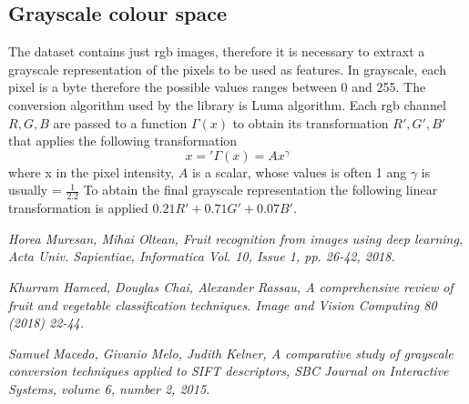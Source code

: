 \documentclass{article}
\begin{document}
\subsection{Grayscale colour space}
The dataset contains just rgb images, therefore it is necessary to extraxt a grayscale representation of the pixels to be used as features.
In grayscale, each pixel is a byte therefore the possible values ranges between 0 and 255. The conversion algorithm used by the library is Luma algorithm. Each rgb channel $R, G, B$ are passed to a function $\Gamma(x)$ to obtain its transformation $R', G', B'$ that applies the following transformation
\begin{equation}
 x = '\Gamma(x) = Ax^{\gamma}
\end{equation}
where x in the pixel intensity, $A$ is a scalar, whose values is often 1 ang $\gamma$ is usually = $\frac{1}{2.2}$
To abtain the final grayscale representation the following linear transformation is applied $0.21 R' + 0.71 G' + 0.07  B'$.  \cite{grayscale conversion}

 

\begin{thebibliography}{9}

\textit{Horea Muresan, Mihai Oltean, Fruit recognition from images using deep learning, Acta Univ. Sapientiae, Informatica Vol. 10, Issue 1, pp. 26-42, 2018.}

\textit{Khurram Hameed, Douglas Chai, Alexander Rassau, A comprehensive review of fruit and vegetable classification techniques. Image and Vision Computing 80 (2018) 22-44.}

\textit{Samuel Macedo, Givanio Melo, Judith Kelner, A comparative study of grayscale conversion techniques applied to SIFT descriptors, SBC Journal on Interactive Systems, volume 6, number 2, 2015.}

\end{thebibliography} 
\end{document}
